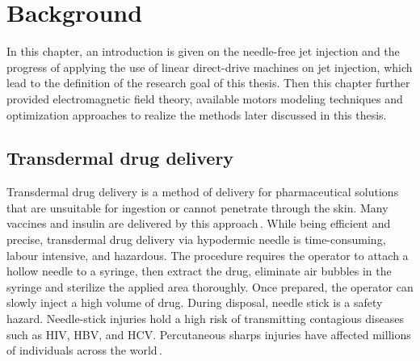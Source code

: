 \chapter{Background}                                \label{Chapter:background}

    In this chapter, an introduction is given on the needle-free jet injection and the progress of applying the use of linear direct-drive machines on jet injection, which lead to the definition of the research goal of this thesis. Then this chapter further provided electromagnetic field theory, available motors modeling techniques and optimization approaches to realize the methods later discussed in this thesis.


\section{Transdermal drug delivery}                 \label{Chapter:background/transdermal drug delivery}

    Transdermal drug delivery is a method of delivery for pharmaceutical solutions that are unsuitable for ingestion or cannot penetrate through the skin. Many vaccines and insulin are delivered by this approach\,\cite{sadrzadeh2007}. While being efficient and precise, transdermal drug delivery via hypodermic needle is time-consuming, labour intensive, and hazardous. The procedure requires the operator to attach a hollow needle to a syringe, then extract the drug, eliminate air bubbles in the syringe and sterilize the applied area thoroughly. Once prepared, the operator can slowly inject a high volume of drug. During disposal, needle stick is a safety hazard. Needle-stick injuries hold a high risk of transmitting contagious diseases such as HIV, HBV, and HCV. Percutaneous sharps injuries have affected millions of individuals across the world\,\cite{pruss2005}. 
    
